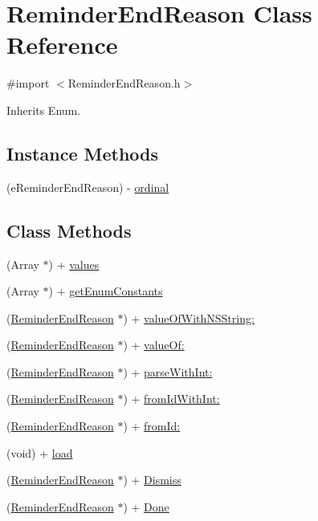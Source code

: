 \hypertarget{interface_reminder_end_reason}{}\section{Reminder\+End\+Reason Class Reference}
\label{interface_reminder_end_reason}


{\ttfamily \#import $<$Reminder\+End\+Reason.\+h$>$}



Inherits Enum.

\subsection*{Instance Methods}
\begin{DoxyCompactItemize}
\item 
(e\+Reminder\+End\+Reason) -\/ \hyperlink{interface_reminder_end_reason_ac2028362b8e50346e5671e5304530978}{ordinal}
\end{DoxyCompactItemize}
\subsection*{Class Methods}
\begin{DoxyCompactItemize}
\item 
(Array $\ast$) + \hyperlink{interface_reminder_end_reason_a9bcb0e0170876c9e0c2314754fd57248}{values}
\item 
(Array $\ast$) + \hyperlink{interface_reminder_end_reason_aa852364ae2322ab184a2fbf219586f9a}{get\+Enum\+Constants}
\item 
(\hyperlink{interface_reminder_end_reason}{Reminder\+End\+Reason} $\ast$) + \hyperlink{interface_reminder_end_reason_aba845e93cbd64e26115f21032080a4e3}{value\+Of\+With\+N\+S\+String\+:}
\item 
(\hyperlink{interface_reminder_end_reason}{Reminder\+End\+Reason} $\ast$) + \hyperlink{interface_reminder_end_reason_a80dba30a0988d5b055e56c8e416ca5d2}{value\+Of\+:}
\item 
(\hyperlink{interface_reminder_end_reason}{Reminder\+End\+Reason} $\ast$) + \hyperlink{interface_reminder_end_reason_a1a481aeb835ed2c1f4a8d616ea4250c1}{parse\+With\+Int\+:}
\item 
(\hyperlink{interface_reminder_end_reason}{Reminder\+End\+Reason} $\ast$) + \hyperlink{interface_reminder_end_reason_ab6fe738fc0bf865706b285bf70b43d47}{from\+Id\+With\+Int\+:}
\item 
(\hyperlink{interface_reminder_end_reason}{Reminder\+End\+Reason} $\ast$) + \hyperlink{interface_reminder_end_reason_abaa08461302514f22b4020165ddd2d09}{from\+Id\+:}
\item 
(void) + \hyperlink{interface_reminder_end_reason_a9005a98928646cb5b7f9492bb90daf8f}{load}
\item 
(\hyperlink{interface_reminder_end_reason}{Reminder\+End\+Reason} $\ast$) + \hyperlink{interface_reminder_end_reason_a6c32e741717a435a6ef7d7ae55f99dc3}{Dismiss}
\item 
(\hyperlink{interface_reminder_end_reason}{Reminder\+End\+Reason} $\ast$) + \hyperlink{interface_reminder_end_reason_a363087e4606350a72e61463ccd506d48}{Done}
\end{DoxyCompactItemize}


